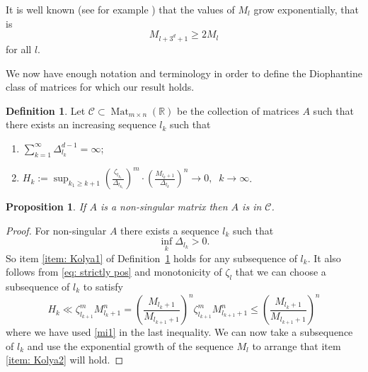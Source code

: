 \documentclass[reqno,11pt, twoside]{amsart}
\theoremstyle{plain}
\newtheorem{prop}[thm]{Proposition}
\theoremstyle{definition}
\newtheorem{defn}[thm]{Definition}
\theoremstyle{definition}
\theoremstyle{remark}
\numberwithin{equation}{section}
\newcommand{\cC}{\mathcal{C}}
\newcommand{\bR}{\mathbb{R}}
\newcommand\pa[1]{\left(#1\right)}
\newcommand\on[1]{\operatorname{#1}}
\begin{document}
 It is well known 
 (see for example
 \cite{BugeaudExponents})
 that the values of $M_l$ grow exponentially,
 that is
 \begin{equation}\label{bl}
M_{l+3^d+1} \ge 2M_l
\end{equation}
for all $l$. 

We now have enough notation and terminology in order to define the Diophantine class of matrices for which our result holds. 
\begin{defn}\label{defn: Kolya}
  Let $\cC\subset \on{Mat}_{m\times n}(\bR)$ be the collection of matrices $A$ such that 
  there exists an increasing sequence $l_k$ such that 
\begin{enumerate}
    \item\label{item: Kolya1} $\sum_{k=1}^\infty \Delta_{l_k}^{d-1} = \infty$;
    \item\label{item: Kolya2}   $
H_k:= \displaystyle{\sup_{k_1\ge k+1}}
\left(\frac{\zeta_{l_{k_1}}}{\Delta_{l_{k_1}}}\right)^m\cdot \left(  \frac{M_{l_{k}+1}}{\Delta_{l_{k}}}\right)^n \to 0, \,\,\ k \to \infty$.
\end{enumerate}
\end{defn}



\begin{prop}
    \label{prop: nonsingular implies C}
    If $A$ is a non-singular matrix then $A$ is in $\cC$.
\end{prop}
\begin{proof}
For non-singular  $A$ there exists a sequence $ l_k$ such that  
\begin{equation}\label{eq: strictly pos}
\inf_k \Delta_{l_k} >0.
\end{equation} 
So item \eqref{item: Kolya1} of Definition~\ref{defn: Kolya} holds 
for any subsequence of $l_k$.
It also follows from \eqref{eq: strictly pos} and monotonicity of 
$\zeta_l$ that we can choose a subsequence of $ l_k$ 
 to satisfy 
 $$H_k\ll \zeta_{l_{k+1}}^m M_{l_k+1}^n= 
 \pa{\frac{M_{l_k+1}}{M_{l_{k+1}+1}}}^n 
 \zeta_{l_{k+1}}^m M_{l_{k+1}+1}^n \le \pa{\frac{M_{l_k+1}}{M_{l_{k+1}+1}}}^n $$ 
 where we have used \eqref{mi1} in the last inequality. We can now take a subsequence of $l_k$ and use the exponential growth of the sequence $M_l$ to arrange that item \eqref{item: Kolya2} will hold.
 \end{proof}
\end{document}
